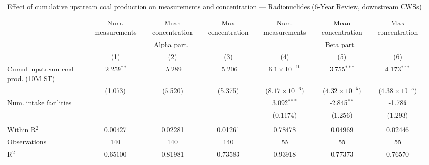 
\begin{table}[htbp]
   
   \caption{\label{tab:6yr_huc02fe_cnt_radio} Effect of cumulative upstream coal production on measurements and concentration --- Radionuclides (6-Year Review, downstream CWSs)}
   \bigskip
   
   \centering
   
   \begin{adjustbox}{width = \textwidth, center}
      
      
      \begin{tabular}{lcccccc}
         \toprule
         
                                             & Num. measurements & Mean concentration & Max concentration & Num. measurements       & Mean concentration      & Max concentration\\  
         
          & \multicolumn{3}{c}{Alpha part.} & \multicolumn{3}{c}{Beta part.} \\ 
         
                                             & (1)               & (2)                & (3)               & (4)                     & (5)                     & (6)\\  
         
         \midrule 
         Cumul. upstream coal prod. (10M ST) & -2.259$^{**}$     & -5.289             & -5.206            & $6.1\times 10^{-10}$    & 3.755$^{***}$           & 4.173$^{***}$\\   
                                             & (1.073)           & (5.520)            & (5.375)           & ($8.17\times 10^{-6}$)  & ($4.32\times 10^{-5}$)  & ($4.38\times 10^{-5}$)\\    
         Num. intake facilities              &                   &                    &                   & 3.092$^{***}$           & -2.845$^{**}$           & -1.786\\   
                                             &                   &                    &                   & (0.1174)                & (1.256)                 & (1.293)\\   
         
          \\
         
         Within R$^2$                        & 0.00427           & 0.02281            & 0.01261           & 0.78478                 & 0.04969                 & 0.02446\\  
         Observations                        & 140               & 140                & 140               & 55                      & 55                      & 55\\  
         R$^2$                               & 0.65000           & 0.81981            & 0.73583           & 0.93918                 & 0.77373                 & 0.76570\\  
         

\end{tabular}
\end{adjustbox}
\end{table}
